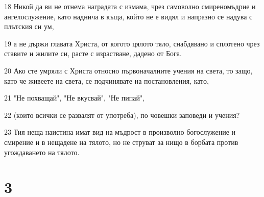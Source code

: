 \par 18 Никой да ви не отнема наградата с измама, чрез самоволно смиреномъдрие и ангелослужение, като наднича в къща, който не е видял и напразно се надува с плътския си ум,
\par 19 а не държи главата Христа, от когото цялото тяло, снабдявано и сплотено чрез ставите и жилите си, расте с израстване, дадено от Бога.
\par 20 Ако сте умряли с Христа относно първоначалните учения на света, то защо, като че живеете на света, се подчинявате на постановления, като,
\par 21 "Не похващай", "Не вкусвай", "Не пипай",
\par 22 (които всички се развалят от употреба), по човешки заповеди и учения?
\par 23 Тия неща наистина имат вид на мъдрост в произволно богослужение и смирение и в нещадене на тялото, но не струват за нищо в борбата против угождаването на тялото.

\chapter{3}

